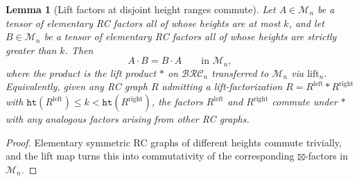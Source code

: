 \documentclass{amsart}
\newtheorem{lemma}{Lemma}[subsection]
\theoremstyle{definition}
\theoremstyle{remark}
\numberwithin{equation}{subsection}
\newcommand{\hr}{\mathtt{ht}}
\newcommand{\BRC}{\mathcal{BRC}}
\begin{document}
\begin{lemma}[Lift factors at disjoint height ranges commute]\label{lemma:liftcommute}
Let $A\in\mathcal{M}_n$ be a tensor of elementary RC factors all of whose heights are at most $k$, and let $B\in\mathcal{M}_n$ be a tensor of elementary RC factors all of whose heights are strictly greater than $k$. Then
$$A\cdot B = B\cdot A\qquad\text{in }\mathcal{M}_n,$$
where the product is the lift product $*$ on $\BRC_n$ transferred to $\mathcal{M}_n$ via $\mathrm{lift}_n$. Equivalently, given any RC graph $R$ admitting a lift-factorization $R=R^{\mathrm{left}}*R^{\mathrm{right}}$ with $\hr(R^{\mathrm{left}})\leq k<\hr(R^{\mathrm{right}})$, the factors $R^{\mathrm{left}}$ and $R^{\mathrm{right}}$ commute under $*$ with any analogous factors arising from other RC graphs.
\end{lemma}
\begin{proof}
Elementary symmetric RC graphs of different heights commute trivially, and the lift map turns this into commutativity of the corresponding $\boxtimes$-factors in $\mathcal{M}_n$.
\end{proof}
\end{document}
